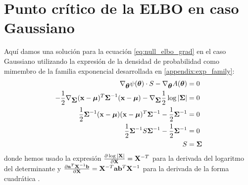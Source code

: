 \section{Punto crítico de la ELBO en caso Gaussiano}\label{appendix:null_grad_elbo}

Aquí damos una solución para la ecuación \ref{eq:null_elbo_grad} en el caso Gaussiano utilizando la expresión de la densidad de probabilidad como mimembro de la familia exponencial desarrollada en \ref{appendix:exp_family}:
\begin{align*}
    \nabla_{\mbox{\boldmath$ \theta $}} \psi(\mbox{\boldmath$ \theta $}) \cdot S - \nabla_{\mbox{\boldmath$ \theta $}} A(\mbox{\boldmath$ \theta $}) &= 0 \\
    -\frac{1}{2} \nabla_{\mbox{\boldmath$ \Sigma $}}  (\mathbf{x}- \mbox{\boldmath$ \mu $})^T \mbox{\boldmath$ \Sigma $}^{-1}(\mathbf{x}-\mbox{\boldmath$ \mu $}) - \nabla_{\mbox{\boldmath$ \Sigma $}} \frac{1}{2} \log |\mbox{\boldmath$ \Sigma $}| &= 0 \\
    \frac{1}{2} \mbox{\boldmath$ \Sigma $}^{-1} (\mathbf{x}- \mbox{\boldmath$ \mu $})(\mathbf{x}-\mbox{\boldmath$ \mu $})^T \mbox{\boldmath$ \Sigma $}^{-1} - \frac{1}{2} \mbox{\boldmath$ \Sigma $}^{-1} &= 0 \\
    \frac{1}{2} \mbox{\boldmath$ \Sigma $}^{-1} S \mbox{\boldmath$ \Sigma $}^{-1} - \frac{1}{2} \mbox{\boldmath$ \Sigma $}^{-1} &= 0 \\
    S &= \mbox{\boldmath$ \Sigma $} 
\end{align*}
donde hemos usado la expresión $\frac{\partial \log|\mathbf{X}|}{\partial \mathbf{X}} = \mathbf{X}^{-T}$ para la derivada del logaritmo del determinante y $\frac{\partial \mathbf{a}^T \mathbf{X}^{-1} \mathbf{b} }{\partial \mathbf{X}} = \mathbf{X}^{-T} \mathbf{a} \mathbf{b}^T \mathbf{X}^{-1}$ para la derivada de la forma cuadrática \cite{Petersen2012}.
